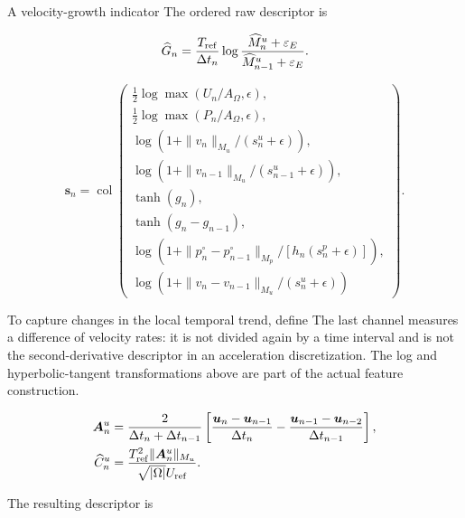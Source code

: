 \documentclass{article}
\providecommand{\DIFaddtex}[1]{{\protect\color{blue} \sf #1}} %
\providecommand{\DIFdeltex}[1]{{\protect\color{red} \scriptsize #1}} %
\providecommand{\DIFaddbegin}{} %
\providecommand{\DIFaddend}{} %
\providecommand{\DIFdelbegin}{} %
\providecommand{\DIFdelend}{} %
\providecommand{\DIFadd}[1]{\texorpdfstring{\DIFaddtex{#1}}{#1}} %
\providecommand{\DIFdel}[1]{\texorpdfstring{\DIFdeltex{#1}}{}} %
\begin{document}
\DIFdel{A velocity-growth indicator }\DIFdelend \DIFaddbegin \DIFadd{The ordered raw descriptor }\DIFaddend is


\DIFdelbegin 
{\color{red}
\begin{equation}
  \widehat G_n
  =
  \frac{T_{\rm ref}}{\Delta t_n}
  \log
  \frac{
    \widehat M_n^u+\varepsilon_E
  }{
    \widehat M_{n-1}^u+\varepsilon_E
  }.
  \label{old:eq:app_t2c_growth}
\end{equation}
}
\DIFdelend \DIFaddbegin 
{\color{blue}
\begin{equation}
\bm s_n=\operatorname{col}\left(
\begin{array}{l}
 \tfrac12\log\max(U_n/A_\Omega,\epsilon),\\
 \tfrac12\log\max(P_n/A_\Omega,\epsilon),\\
 \log(1+\|v_n\|_{M_u}/(s_n^u+\epsilon)),\\
 \log(1+\|v_{n-1}\|_{M_u}/(s_{n-1}^u+\epsilon)),\\
 \tanh(g_n),\\
 \tanh(g_n-g_{n-1}),\\
 \log(1+\|p_n^\circ-p_{n-1}^\circ\|_{M_p}/[h_n(s_n^p+\epsilon)]),\\
 \log(1+\|v_n-v_{n-1}\|_{M_u}/(s_n^u+\epsilon))
\end{array}\right).
\label{eq:app_t2c_descriptor}
\end{equation}
}
\DIFaddend 


\DIFdelbegin \DIFdel{To capture changes in the local temporal trend, define
}\DIFdelend \DIFaddbegin \DIFadd{The last channel measures a difference of velocity rates: it is not divided again by a time interval and is not the second-derivative descriptor in an acceleration discretization. The log and hyperbolic-tangent transformations above are part of the actual feature construction.
}\DIFaddend 

\DIFdelbegin 
{\color{red}
\begin{align}
  \bm A_n^u
  &=
  \frac{2}{\Delta t_n+\Delta t_{n-1}}
  \left[
    \frac{\bm u_n-\bm u_{n-1}}{\Delta t_n}
    -
    \frac{\bm u_{n-1}-\bm u_{n-2}}{\Delta t_{n-1}}
  \right],
  \nonumber\\
  \widehat C_n^u
  &=
  \frac{
    T_{\rm ref}^2
    \|\bm A_n^u\|_{M_u}
  }{
    \sqrt{|\Omega|}U_{\rm ref}
  }.
  \label{old:eq:app_t2c_curvature}
\end{align}
}

\DIFdel{The resulting descriptor is }%
\end{document}
